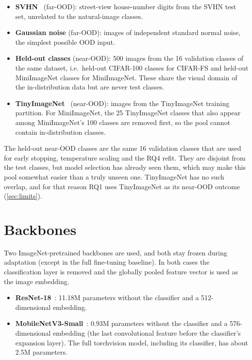 \begin{itemize}
\item \textbf{SVHN}~\cite{netzer2011svhn} (far-OOD): street-view house-number digits from the SVHN test
set, unrelated to the natural-image classes.
\item \textbf{Gaussian noise} (far-OOD): images of independent standard normal noise, the simplest
possible OOD input.
\item \textbf{Held-out classes} (near-OOD): 500 images from the 16 validation classes of the same
dataset, i.e.\ held-out CIFAR-100 classes for CIFAR-FS and held-out MiniImageNet classes for
MiniImageNet. These share the visual domain of the in-distribution data but are never test classes.
\item \textbf{TinyImageNet}~\cite{le2015tinyimagenet} (near-OOD): images from the TinyImageNet training
partition. For MiniImageNet, the 25 TinyImageNet classes that also appear among MiniImageNet's 100
classes are removed first, so the pool cannot contain in-distribution classes.
\end{itemize}

The held-out near-OOD classes are the same 16 validation classes that are used for early stopping,
temperature scaling and the RQ4 refit. They are disjoint from the test classes, but model selection has
already seen them, which may make this pool somewhat easier than a truly unseen one. TinyImageNet has no
such overlap, and for that reason RQ1 uses TinyImageNet as its near-OOD outcome (\cref{sec:limits}).

\section{Backbones}

Two ImageNet-pretrained backbones are used, and both stay frozen during adaptation (except in the full
fine-tuning baseline). In both cases the classification layer is removed and the globally pooled feature
vector is used as the image embedding.

\begin{itemize}
\item \textbf{ResNet-18}~\cite{he2016resnet}: 11.18M parameters without the classifier and a
512-dimensional embedding.
\item \textbf{MobileNetV3-Small}~\cite{howard2019mobilenetv3}: 0.93M parameters without the classifier
and a 576-dimensional embedding (the last convolutional feature before the classifier's expansion
layer). The full torchvision model, including its classifier, has about 2.5M parameters.
\end{itemize}

